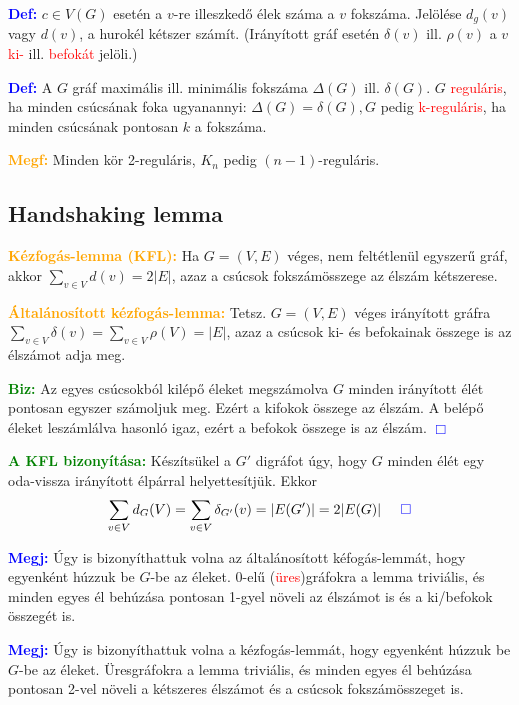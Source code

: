 \documentclass[../szamtud.tex]{subfiles}
\begin{document}
        \textcolor{blue}{\textbf{Def:}} $c \in V(G)$ esetén a $v$-re illeszkedő élek száma a $v$ fokszáma. Jelölése $d_g(v)$ vagy $d(v)$, a hurokél kétszer számít. (Irányított gráf esetén $\delta(v)$ ill. $\rho(v)$ a $v$ \textcolor{red}{ki-} ill. \textcolor{red}{befokát} jelöli.)

        \textcolor{blue}{\textbf{Def:}} A $G$ gráf maximális ill. minimális fokszáma $\Delta(G)$ ill. $\delta(G)$. $G$ \textcolor{red}{reguláris}, ha minden csúcsának foka ugyanannyi: $\Delta(G)=\delta(G),G$ pedig \textcolor{red}{k-reguláris}, ha minden csúcsának pontosan $k$ a fokszáma.

        \textcolor{orange}{\textbf{Megf:}} Minden kör 2-reguláris, $K_n$ pedig $(n-1)$-reguláris.

    \subsection{Handshaking lemma}

        \textcolor{orange}{\textbf{Kézfogás-lemma (KFL):}} Ha $G = (V,E)$ véges, nem feltétlenül egyszerű gráf, akkor $\sum_{v \in V} d(v)=2|E|$, azaz a csúcsok fokszámösszege az élszám kétszerese.
    
        \textcolor{orange}{\textbf{Általánosított kézfogás-lemma:}} Tetsz. $G = (V,E)$ véges irányított gráfra $\sum_{v \in V} \delta (v) = \sum_{v \in V} \rho (V) = |E|$, azaz a csúcsok ki- és befokainak összege is az élszámot adja meg. 

        \textcolor{green}{\textbf{Biz:}} Az egyes csúcsokból kilépő éleket megszámolva $G$ minden irányított élét pontosan egyszer számoljuk meg. Ezért a kifokok összege az élszám. A belépő éleket leszámlálva hasonló igaz, ezért a befokok összege is az élszám. \textcolor{blue}{$\Box$} 
        
        \textcolor{green}{\textbf{A KFL bizonyítása:}} Készítsükel a $G'$ digráfot úgy, hogy $G$ minden élét egy oda-vissza irányított élpárral helyettesítjük. Ekkor \[\sum_{v \in V} d_G(V) = \sum_{v \in V} \delta_{G'} (v) = |E(G')| = 2|E(G)| \;\;\;\;\;\textcolor{blue}{\Box} \]

        \textcolor{blue}{\textbf{Megj:}} Úgy is bizonyíthattuk volna az általánosított kéfogás-lemmát, hogy egyenként húzzuk be $G$-be az éleket. 0-elű (\textcolor{red}{üres})gráfokra a lemma triviális, és minden egyes él behúzása pontosan 1-gyel növeli az élszámot is és a ki/befokok összegét is.

        \textcolor{blue}{\textbf{Megj:}} Úgy is bizonyíthattuk volna a kézfogás-lemmát, hogy egyenként húzzuk be $G$-be az éleket. Üresgráfokra a lemma triviális, és minden egyes él behúzása pontosan 2-vel növeli a kétszeres élszámot és a csúcsok fokszámösszeget is.
\end{document}
